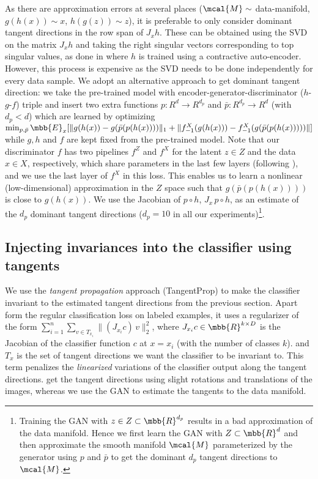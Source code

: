 \documentclass{article}
\begin{document}
As there are approximation errors at several places ($\mcal{M}\sim $ data-manifold, $g(h(x))\sim x$, $h(g(z))\sim z$), it is preferable to only consider dominant tangent directions in the row span of $J_xh$. These can be obtained using the SVD on the matrix $J_x h$ and taking the right singular vectors corresponding to top singular values, as done in \cite{rifai2011manifold} where $h$ is trained using a contractive auto-encoder.  However, this process is expensive as the SVD needs to be done independently for every data sample. We adopt an alternative approach to get dominant tangent direction: we take the pre-trained model with encoder-generator-discriminator ($h$-$g$-$f$) triple and insert two extra functions $p:R^d\to R^{d_p}$ and $\bar{p}:R^{d_p}\to R^d$ (with $d_p < d$) which are learned by optimizing $\min_{p,\bar{p}} \mbb{E}_x [\lVert g(h(x))-g(\bar{p}(p(h(x))))\rVert_1 + \lVert f^{X}_{-1}(g(h(x))) - f^X_{-1}(g(\bar{p}(p(h(x)))))\rVert]$ while $g,h$ and $f$ are kept fixed from the pre-trained model. Note that our discriminator $f$ has two pipelines $f^Z$ and $f^X$ for the latent $z\in Z$ and the data $x\in X$, respectively, which share parameters in the last few layers (following \cite{donahue2016adversarial}), and we use the last layer of $f^X$ in this loss. This enables us to learn a nonlinear (low-dimensional) approximation in the $Z$ space such that $g(\bar{p}(p(h(x))))$ is close to $g(h(x))$. We use the Jacobian of $p\circ h$, $J_x\, p\circ h$, as an estimate of the $d_p$ dominant tangent directions ($d_p=10$ in all our experiments)\footnote{Training the GAN with $z\in Z \subset \mbb{R}^{d_p}$ results in a bad approximation of the data manifold. Hence we first learn the GAN with $Z\subset\mbb{R}^d$ and then approximate the smooth manifold $\mcal{M}$ parameterized by the generator using $p$ and $\bar{p}$ to get the dominant $d_p$ tangent directions to $\mcal{M}$.}. 

\subsection{Injecting invariances into the classifier using tangents}\label{subsec:invar}
We use the \emph{tangent propagation} approach (TangentProp) \cite{simard1998transformation} to make the classifier invariant to the estimated tangent directions from the previous section. Apart form the regular classification loss on labeled examples, it uses a regularizer of the form $\sum_{i=1}^n \sum_{v\in T_{x_i} }\lVert (J_{x_i} c) \, v\rVert_2^2$, where $J_{x_i} c\in\mbb{R}^{k\times D}$ is the Jacobian of the classifier function $c$ at $x=x_i$ (with the number of classes $k$). and $T_x$ is the set of tangent directions we want the classifier to be invariant to. This term penalizes the \emph{linearized} variations of the classifier output along the tangent directions. \citet{simard1998transformation} get the tangent directions using slight rotations and translations of the images, whereas we use the GAN to estimate the tangents to the data manifold. 
\end{document}
